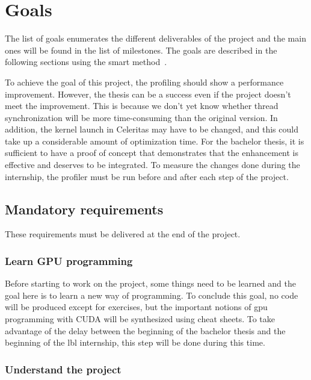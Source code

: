 \chapter{Goals}
\label{spec:ch:goals}

The list of goals enumerates the different deliverables of the project and the main ones will be found in the list of milestones.
The goals are described in the following sections using the \acrshort{smart} method~\cite{how_to_write_smart_goals_kat_boogaard}.

To achieve the goal of this project, the profiling should show a performance improvement.
However, the thesis can be a success even if the project doesn't meet the improvement.
This is because we don't yet know whether thread synchronization will be more time-consuming than the original version.
In addition, the kernel launch in Celeritas may have to be changed, and this could take up a considerable amount of optimization time.
For the bachelor thesis, it is sufficient to have a proof of concept that demonstrates that the enhancement is effective and deserves to be integrated.
To measure the changes done during the internship, the profiler must be run before and after each step of the project.

\section{Mandatory requirements}
\label{spec:ch:goals:mandatory-requirements}

These requirements must be delivered at the end of the project.


\subsection{Learn GPU programming}
\label{spec:ch:goals:mandatory-requirements:learn-gpu-programming}

Before starting to work on the project, some things need to be learned and the goal here is to learn a new way of programming.
To conclude this goal, no code will be produced except for exercises, but the important notions of \acrshort{gpu} programming with CUDA will be synthesized using cheat sheets.
To take advantage of the delay between the beginning of the bachelor thesis and the beginning of the \acrshort{lbl} internship, this step will be done during this time.


\subsection{Understand the project}
\label{spec:ch:goals:mandatory-requirements:understand-the-project}

